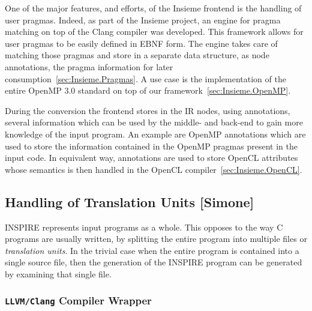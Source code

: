 One of the major features, and efforts, of the Insieme frontend is the handling
of user pragmas. Indeed, as part of the Insieme project, an engine for pragma
matching on top of the Clang compiler was developed. This framework allows for
user pragmas to be easily defined in EBNF form. The engine takes care of
matching those pragmas and store in a separate data structure, as node
annotations, the pragma information for later
consumption~\ref{sec:Insieme.Pragmas}. A use case is the implementation of the
entire OpenMP 3.0 standard on top of our framework~\ref{sec:Insieme.OpenMP}.

During the conversion the frontend stores in the IR nodes, using annotations,
several information which can be used by the middle- and back-end to gain more
knowledge of the input program. An example are OpenMP annotations which are used
to store the information contained in the OpenMP pragmas present in the input
code. In equivalent way, annotations are used to store OpenCL attributes whose
semantics is then handled in the OpenCL compiler~\ref{sec:Insieme.OpenCL}.

\subsection{Handling of Translation Units [Simone]}
\label{sec:Insieme.Frontend.TranslationUnits}

INSPIRE represents input programs as a whole. This opposes to the way C programs
are usually written, by splitting the entire program into multiple files or
\emph{translation units}. In the trivial case when the entire program is
contained into a single source file, then the generation of the INSPIRE program
can be generated by examining that single file.

\subsubsection{{\tt LLVM/Clang} Compiler Wrapper}

